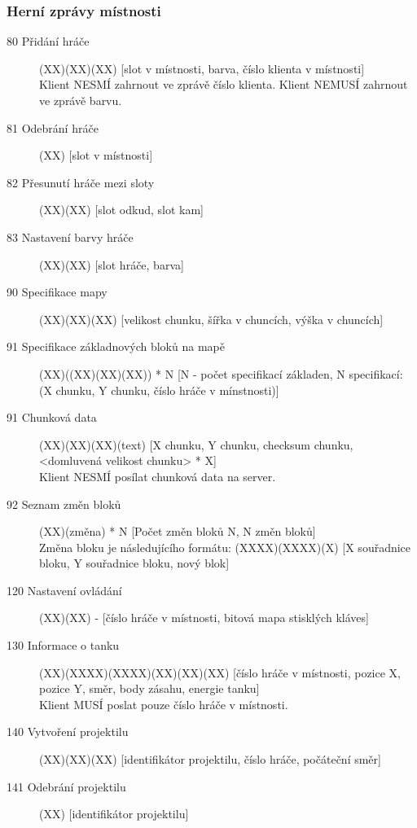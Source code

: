 \documentclass[12pt,a4paper]{article}
\begin{document}
\subsubsection*{Herní zprávy místnosti}
\begin{description}
\item[80 Přidání hráče] (XX)(XX)(XX) [slot v místnosti, barva, číslo klienta v místnosti] \\
Klient NESMÍ zahrnout ve zprávě číslo klienta. Klient NEMUSÍ zahrnout ve zprávě barvu.
\item[81 Odebrání hráče] (XX) [slot v místnosti]
\item[82 Přesunutí hráče mezi sloty] (XX)(XX) [slot odkud, slot kam]
\item[83 Nastavení barvy hráče] (XX)(XX) [slot hráče, barva]

\item[90 Specifikace mapy] (XX)(XX)(XX) [velikost chunku, šířka v chuncích, výška v chuncích]
\item[91 Specifikace základnových bloků na mapě] (XX)((XX)(XX)(XX)) * N [N - počet specifikací základen, N specifikací: (X chunku, Y chunku, číslo hráče v mínstnosti)]
\item[91 Chunková data] (XX)(XX)(XX)(text) [X chunku, Y chunku, checksum chunku, <domluvená velikost chunku> * X]\\
Klient NESMÍ posílat chunková data na server.
\item[92 Seznam změn bloků] (XX)(změna) * N [Počet změn bloků N, N změn bloků]\\ 
Změna bloku je následujícího formátu: (XXXX)(XXXX)(X) [X souřadnice bloku, Y souřadnice bloku, nový blok]

\item[120 Nastavení ovládání] (XX)(XX) - [číslo hráče v místnosti, bitová mapa stisklých kláves]
\item[130 Informace o tanku] (XX)(XXXX)(XXXX)(XX)(XX)(XX) [číslo hráče v místnosti, pozice X, pozice Y, směr, body zásahu, energie tanku] \\
Klient MUSÍ poslat pouze číslo hráče v místnosti.
\item[140 Vytvoření projektilu] (XX)(XX)(XX) [identifikátor projektilu, číslo hráče, počáteční směr]
\item[141 Odebrání projektilu] (XX) [identifikátor projektilu]
\end{description}




\end{document}
